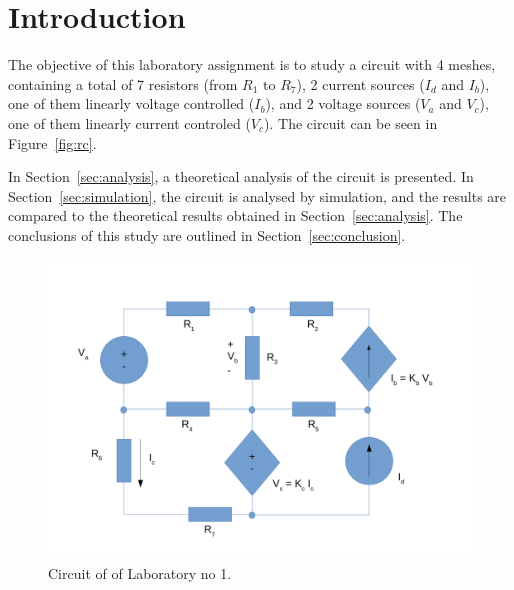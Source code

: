\section{Introduction}
\label{sec:introduction}

The objective of this laboratory assignment is to study a circuit with 4 meshes, containing a total of 7 resistors (from $R_1$ to $R_7$), 2 current sources ($I_d$ and $I_b$), one of them linearly voltage controlled ($I_b$), and 2 voltage sources ($V_a$ and $V_c$), one of them linearly current controled ($V_c$). The circuit can be seen in Figure~\ref{fig:rc}.

In Section~\ref{sec:analysis}, a theoretical analysis of the circuit is
presented. In Section~\ref{sec:simulation}, the circuit is analysed by
simulation, and the results are compared to the theoretical results obtained in
Section~\ref{sec:analysis}. The conclusions of this study are outlined in
Section~\ref{sec:conclusion}.

\begin{figure}[h] \centering
\includegraphics[width=0.4\linewidth]{circuit_intro.pdf}
\caption{Circuit of of Laboratory no 1.}
\end{figure}

